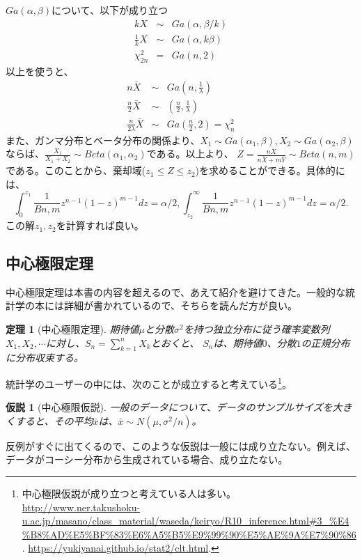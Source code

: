 \documentclass[a4paper,11pt,dvipdfmx]{jsarticle}
\newtheorem{theo}{定理}[section]
\newtheorem{hypoth}{仮説}[section]
\begin{document}
$Ga(\alpha,\beta)$について、以下が成り立つ
\begin{eqnarray}
    k X &\sim& Ga(\alpha,\beta/k) \\
    \frac{1}{k} X &\sim& Ga(\alpha,k\beta)\\
    \chi^2_{2n}&=&Ga(n,2) 
\end{eqnarray}
以上を使うと、
\begin{eqnarray*}
    n\bar{X} &\sim& Ga(n,\frac{1}{\lambda}) \\
    \frac{n}{2}\bar{X} &\sim&(\frac{n}{2},\frac{1}{\lambda}) \\
    \frac{n}{2\lambda}\bar{X} &\sim& Ga(\frac{n}{2},2)=\chi^2_{n}
\end{eqnarray*}
また、ガンマ分布とベータ分布の関係より、$X_1 \sim Ga(\alpha_1,\beta),X_2\sim Ga(\alpha_2,\beta)$ならば、$\frac{X_1}{X_1+X_2}\sim Beta(\alpha_1,\alpha_2)$である。以上より、
$Z=\frac{n\bar{X}}{n\bar{X}+m\bar{Y}}\sim Beta(n,m)$である。このことから、棄却域($z_1 \leq Z \leq z_2$)を求めることができる。具体的には、
\begin{equation}
    \int_0^{z_1}\frac{1}{B{n,m}}z^{n-1}(1-z)^{m-1}dz = \alpha/2,      \int_{z_2}^{\infty}\frac{1}{B{n,m}}z^{n-1}(1-z)^{m-1}dz = \alpha/2.
\end{equation}
この解$z_1,z_2$を計算すれば良い。








\subsection{中心極限定理}
中心極限定理は本書の内容を超えるので、あえて紹介を避けてきた。一般的な統計学の本には詳細が書かれているので、そちらを読んだ方が良い。
\begin{theo}[中心極限定理]
    期待値$\mu$と分散$\sigma^2$を持つ独立分布に従う確率変数列$X_1,X_2,\cdots$に対し、$S_n=\sum_{k=1}^nX_k$とおくと、
    $S_n$は、期待値$0$、分散$1$の正規分布に分布収束する。
\end{theo}

統計学のユーザーの中には、次のことが成立すると考えている\footnote{
    中心極限仮説が成り立つと考えている人は多い。
    \url{http://www.ner.takushoku-u.ac.jp/masano/class_material/waseda/keiryo/R10_inference.html#3_%E4%B8%AD%E5%BF%83%E6%A5%B5%E9%99%90%E5%AE%9A%E7%90%86} .
    \url{https://yukiyanai.github.io/stat2/clt.html}.
    }。
\begin{hypoth}[中心極限仮説]
    一般のデータについて、データのサンプルサイズを大きくすると、その平均$\bar{x}$は、$\bar{x}\sim N(\mu,\sigma^2/n)$。
\end{hypoth}
反例がすぐに出てくるので、このような仮説は一般には成り立たない。例えば、データがコーシー分布から生成されている場合、成り立たない。
\end{document}
